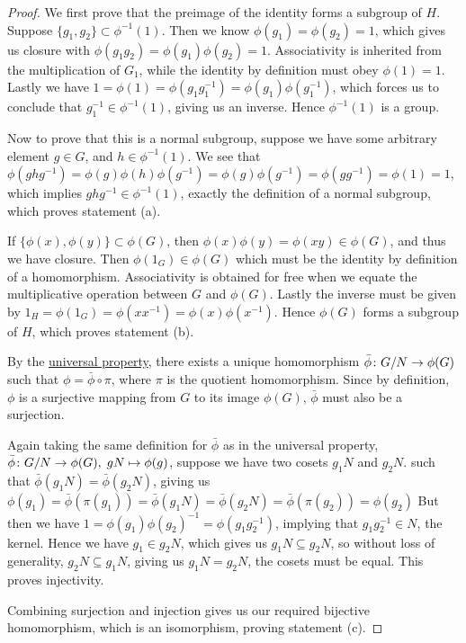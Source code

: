 \begin{proof}
    We first prove that the preimage of the identity
    forms a subgroup of \(H\).
    Suppose \(\{g_1,g_2\} \subset \phi^{-1}(1)\).
    Then we know \(\phi(g_1) = \phi(g_2) = 1\),
    which gives us closure with \(\phi(g_1 g_2) = \phi(g_1)\phi(g_2) = 1\).
    Associativity is inherited from the multiplication of \(G_1\),
    while the identity by definition must obey \(\phi(1) = 1\).
    Lastly we have \(1 = \phi(1) = \phi(g_1 g_1^{-1})
    = \phi(g_1)\phi(g_1^{-1})\),
    which forces us to conclude that \(g_1^{-1} \in \phi^{-1}(1)\),
    giving us an inverse.
    Hence \(\phi^{-1}(1)\) is a group.

    Now to prove that this is a normal subgroup,
    suppose we have some arbitrary element \(g \in G\),
    and \(h \in \phi^{-1}(1)\).
    We see that \(\phi(ghg^{-1}) = \phi(g)\phi(h)\phi(g^{-1})
    = \phi(g)\phi(g^{-1}) = \phi(gg^{-1}) = \phi(1) = 1\),
    which implies \(ghg^{-1} \in \phi^{-1}(1)\),
    exactly the definition of a normal subgroup,
    which proves statement (a).

    \medskip

    If \(\{\phi(x),\phi(y)\} \subset \phi(G)\),
    then \(\phi(x)\phi(y) = \phi(xy) \in \phi(G)\),
    and thus we have closure.
    Then \(\phi(1_G) \in \phi(G)\)
    which must be the identity by definition of a homomorphism.
    Associativity is obtained for free
    when we equate the multiplicative operation
    between \(G\) and \(\phi(G)\).
    Lastly the inverse must be given by
    \(1_H = \phi(1_G) = \phi(xx^{-1}) = \phi(x)\phi(x^{-1})\).
    Hence \(\phi(G)\) forms a subgroup of \(H\),
    which proves statement (b).

    \medskip

    By the \hyperref[thm:univ-prop-quotient-group]{universal property},
    there exists a unique homomorphism \(\bar{\phi}\colon G/N\to\phi(G)\)
    such that \(\phi = \bar{\phi}\circ\pi\),
    where \(\pi\) is the quotient homomorphism.
    Since by definition, \(\phi\) is a surjective mapping
    from \(G\) to its image \(\phi(G)\),
    \(\bar{\phi}\) must also be a surjection.

    Again taking the same definition for \(\bar{\phi}\)
    as in the universal property,
    \(\bar{\phi}\colon G/N\to\phi(G),\;gN\mapsto\phi(g)\),
    suppose we have two cosets \(g_1 N\) and \(g_2 N\).
    such that \(\bar{\phi}(g_1 N) = \bar{\phi}(g_2 N)\),
    giving us \(\phi(g_1) = \bar{\phi}(\pi(g_1)) = \bar{\phi}(g_1 N)
    = \bar{\phi}(g_2 N) = \bar{\phi}(\pi(g_2)) = \phi(g_2)\)
    But then we have \(1 = \phi(g_1){\phi(g_2)}^{-1} = \phi(g_1 g_2^{-1})\),
    implying that \(g_1 g_2^{-1} \in N\), the kernel.
    Hence we have \(g_1 \in g_2 N\),
    which gives us \(g_1 N \subseteq g_2 N\),
    so without loss of generality, \(g_2 N \subseteq g_1 N\),
    giving us \(g_1 N = g_2 N\), the cosets must be equal.
    This proves injectivity.

    Combining surjection and injection
    gives us our required bijective homomorphism,
    which is an isomorphism,
    proving statement (c).
\end{proof}

